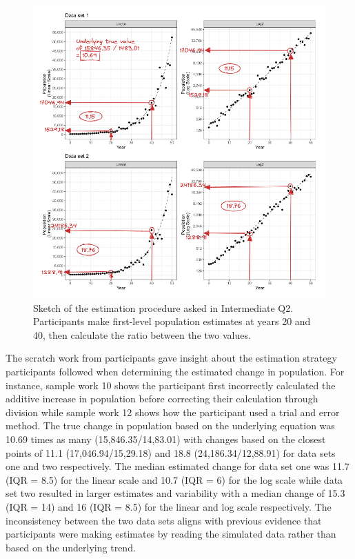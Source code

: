 \documentclass[print]{nuthesis}
\begin{document}
\begin{figure}[tbp]

{\centering \includegraphics[width=1\linewidth,]{images/03-estimation/qi2-sketch} 

}

\caption[Intermediate Q2 sketch]{Sketch of the estimation procedure asked in Intermediate Q2. Participants make first-level population estimates at years 20 and 40, then calculate the ratio between the two values.}\label{fig:qi2-sketch}
\end{figure}

The scratch work from participants gave insight about the estimation strategy participants followed when determining the estimated change in population.
For instance, sample work 10 shows the participant first incorrectly calculated the additive increase in population before correcting their calculation through division while sample work 12 shows how the participant used a trial and error method.
The true change in population based on the underlying equation was 10.69 times as many (15,846.35/14,83.01) with changes based on the closest points of 11.1 (17,046.94/15,29.18) and 18.8 (24,186.34/12,88.91) for data sets one and two respectively.
The median estimated change for data set one was 11.7 (IQR = 8.5) for the linear scale and 10.7 (IQR = 6) for the log scale while data set two resulted in larger estimates and variability with a median change of 15.3 (IQR = 14) and 16 (IQR = 8.5) for the linear and log scale respectively.
The inconsistency between the two data sets aligns with previous evidence that participants were making estimates by reading the simulated data rather than based on the underlying trend.
\end{document}
